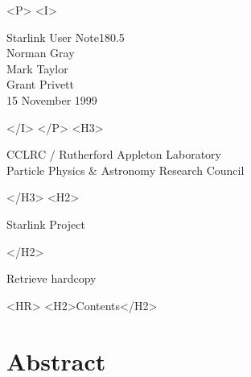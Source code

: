 \documentclass[twoside,11pt]{article}
\newcommand{\stardoccategory}  {Starlink User Note}
\newcommand{\stardocsource}    {sun\stardocnumber}
\newcommand{\stardocnumber}    {180.5}
\newcommand{\stardocauthors}   {Norman Gray\\Mark Taylor\\Grant Privett}
\newcommand{\stardocdate}      {15 November 1999}
\newcommand{\htmladdnormallink}[2]{#1}
\newcommand{\htmladdimg}[1]{}
\newcommand{\htmlref}[2]{#1}
\newcommand{\htmladdtonavigation}[1]{}
\newcommand{\xlabel}[1]{}
\newcommand{\latexonlytoc}[0]{\tableofcontents}
\begin{document}
\begin{htmlonly}
   \begin{rawhtml} <P> <I> \end{rawhtml}
   \stardoccategory \stardocnumber \\
   \stardocauthors \\
   \stardocdate
   \begin{rawhtml} </I> </P> <H3> \end{rawhtml}
      \htmladdnormallink{CCLRC}{http://www.cclrc.ac.uk} /
      \htmladdnormallink{Rutherford Appleton Laboratory}
                        {http://www.cclrc.ac.uk/ral} \\
      \htmladdnormallink{Particle Physics \& Astronomy Research Council}
                        {http://www.pparc.ac.uk} \\
   \begin{rawhtml} </H3> <H2> \end{rawhtml}
      \htmladdnormallink{Starlink Project}{http://star-www.rl.ac.uk/}
   \begin{rawhtml} </H2> \end{rawhtml}
   \htmladdnormallink{\htmladdimg{source.gif} Retrieve hardcopy}
      {http://star-www.rl.ac.uk/cgi-bin/hcserver?\stardocsource}\\

  \label{stardoccontents}
  \begin{rawhtml}
    <HR>
    <H2>Contents</H2>
  \end{rawhtml}
  \renewcommand{\latexonlytoc}[0]{}
  \htmladdtonavigation{\htmlref{\htmladdimg{contents_motif.gif}}
        {stardoccontents}}

  \section{\xlabel{abstract}Abstract}
\end{htmlonly}
\end{document}
